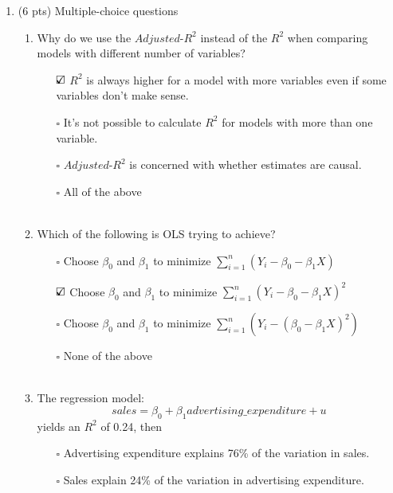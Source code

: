 \documentclass{./../../Latex/tests}
\begin{document}
\thispagestyle{plain}
\vspace{0.5em}

\begin{enumerate}
\item (6 pts) Multiple-choice questions 
\begin{enumerate}
\item Why do we use the $Adjusted$-$R^2$ instead of the $R^2$ when comparing models with different number of variables? \\
\begin{enumerate}
	\item[$\text{\rlap{$\checkmark$}}\square$] $R^2$ is always higher for a model with more variables even if some variables don't make sense.
	\item[$\square$] It's not possible to calculate $R^2$ for models with more than one variable.
	\item[$\square$] $Adjusted$-$R^2$ is concerned with whether estimates are causal.
	\item[$\square$] All of the above \\~\\
\end{enumerate}
\item Which of the following is OLS trying to achieve?
 \begin{enumerate}
	\item[$\square$] Choose $\beta_0$ and $\beta_1$ to minimize $\sum_{i=1}^n (Y_i-\beta_0 -\beta_1 X) $
	\item[$\text{\rlap{$\checkmark$}}\square$] Choose $\beta_0$ and $\beta_1$ to minimize $\sum_{i=1}^n (Y_i-\beta_0 -\beta_1 X)^2 $
	\item[$\square$] Choose $\beta_0$ and $\beta_1$ to minimize $\sum_{i=1}^n (Y_i-(\beta_0 -\beta_1 X)^2) $
	\item[$\square$] None of the above \\~\\
\end{enumerate}
\item The regression model:
$$ sales = \beta_0 + \beta_1 advertising\_expenditure+u $$
yields an $R^2$ of 0.24, then
\begin{enumerate}
	\item[$\square$] Advertising expenditure explains 76\% of the variation in sales. 
	\item[$\square$] Sales explain 24\% of the variation in advertising expenditure. 

\end{enumerate}
\end{enumerate}
\end{enumerate}
\end{document}
